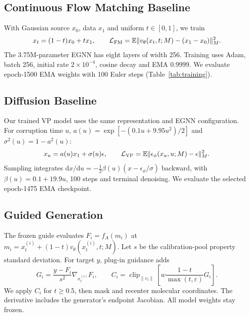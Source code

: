 \documentclass{article}
\begin{document}
\subsection{Continuous Flow Matching Baseline}\label{sec:fm}
With Gaussian source $x_0$, data $x_1$ and uniform $t\in[0,1]$, we train
\begin{equation}
x_t=(1-t)x_0+tx_1,\qquad \mathcal L_{\rm FM}=\mathbb E\|v_\theta(x_t,t;M)-(x_1-x_0)\|_M^2.
\label{eq:fm}
\end{equation}
The 3.75M-parameter EGNN has eight layers of width 256. Training uses Adam, batch 256, initial rate $2\times10^{-4}$, cosine decay and EMA 0.9999. We evaluate epoch-1500 EMA weights with 100 Euler steps (Table~\ref{tab:training}).

\subsection{Diffusion Baseline}\label{sec:diff}
Our trained VP model uses the same representation and EGNN configuration. For corruption time $u$, $a(u)=\exp[-(0.1u+9.95u^2)/2]$ and $\sigma^2(u)=1-a^2(u)$:
\begin{equation}
x_u=a(u)x_1+\sigma(u)\epsilon,\qquad\mathcal L_{\rm VP}=\mathbb E\|\epsilon_\phi(x_u,u;M)-\epsilon\|_M^2.
\label{eq:vp}
\end{equation}
Sampling integrates $\mathrm dx/\mathrm du=-\frac12\beta(u)(x-\epsilon_\phi/\sigma)$ backward, with $\beta(u)=0.1+19.9u$, 100 steps and terminal denoising. We evaluate the selected epoch-1475 EMA checkpoint.

\subsection{Guided Generation}\label{sec:guidance}
The frozen guide evaluates $F_i=f_A(m_i)$ at $m_i=x_t^{(i)}+(1-t)v_\theta(x_t^{(i)},t;M)$. Let $s$ be the calibration-pool property standard deviation. For target $y$, plug-in guidance adds
\begin{equation}
G_i=\frac{y-F_i}{s^2}\nabla_{x_t^{(i)}}F_i,\qquad
C_i=\operatorname{clip}_{\|v_i\|}\!\left[w\frac{1-t}{\max(t,\varepsilon)}G_i\right].
\label{eq:plug}
\end{equation}
We apply $C_i$ for $t\ge0.5$, then mask and recenter molecular coordinates. The derivative includes the generator's endpoint Jacobian. All model weights stay frozen.
\end{document}
